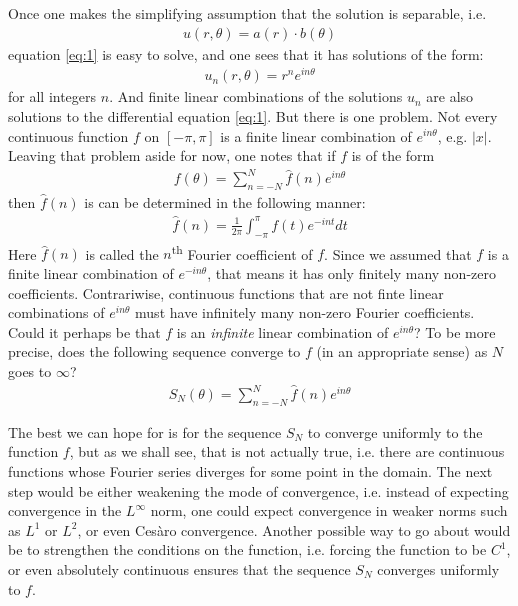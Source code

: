 \documentclass[12pt, titlepage]{article}
\theoremstyle{definition}
\begin{document}
Once one makes the simplifying assumption that the solution is separable, i.e.
\begin{align*}
    u(r, \theta) = a(r) \cdot b(\theta)
\end{align*}
equation \ref{eq:1} is easy to solve, and one sees that it has solutions of the form:
\begin{align*}
    u_n(r, \theta) = r^n e^{in\theta}
\end{align*}
for all integers $n$. And finite linear combinations of the solutions $u_n$ are also solutions to the differential equation \ref{eq:1}. But there is one problem. Not every continuous function $f$ on $[-\pi, \pi]$ is a finite linear combination of $e^{in\theta}$, e.g. $|x|$. Leaving that problem aside for now, one notes that if $f$ is of the form
\begin{align*}
    f(\theta) = \sum_{n = -N}^{N} \widehat{f}(n) e^{in\theta}
\end{align*}
then $\widehat{f}(n)$ is can be determined in the following manner:
\begin{align}
    \widehat{f}(n) = \frac{1}{2\pi} \int_{-\pi}^{\pi} f(t) e^{-int} dt \label{eq:2}
\end{align}
Here $\widehat{f}(n)$ is called the $n$\textsuperscript{th} Fourier coefficient of $f$. Since we assumed that $f$ is a finite linear combination of $e^{-in\theta}$, that means it has only finitely many non-zero coefficients. Contrariwise, continuous functions that are not finte linear combinations of $e^{in\theta}$ must have infinitely many non-zero Fourier coefficients. Could it perhaps be that $f$ is an \emph{infinite} linear combination of $e^{in\theta}$? To be more precise, does the following sequence converge to $f$ (in an appropriate sense) as $N$ goes to $\infty$?
\begin{align*}
    S_N(\theta) = \sum_{n = -N}^{N} \widehat{f}(n) e^{in\theta}
\end{align*}

The best we can hope for is for the sequence $S_N$ to converge uniformly to the function $f$, but as we shall see, that is not actually true, i.e. there are continuous functions whose Fourier series diverges for some point in the domain. The next step would be either weakening the mode of convergence, i.e. instead of expecting convergence in the $L^{\infty}$ norm, one could expect convergence in weaker norms such as $L^1$ or $L^2$, or even Cesàro convergence. Another possible way to go about would be to strengthen the conditions on the function, i.e. forcing the function to be $C^1$, or even absolutely continuous ensures that the sequence $S_N$ converges uniformly to $f$.
\end{document}
